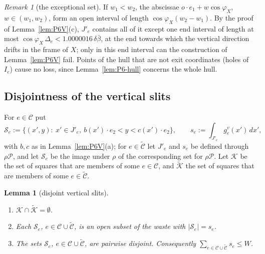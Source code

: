 \documentclass[11pt]{amsart}
\newcommand{\cP}{\mathcal P}
\newcommand{\bbar}{\bar\beta}
\newtheorem{lemma}[theorem]{Lemma}
\theoremstyle{definition}
\theoremstyle{remark}
\newtheorem{remark}[theorem]{Remark}
\numberwithin{equation}{section}
\begin{document}
\begin{remark}[the exceptional set]\label{rem:P6-exceptional}
If $w_1<w_2$, the abscissae $o\cdot e_1+w\cos\varphi_X$, $w\in(w_1,w_2)$, form an open interval of length
$\cos\varphi_X(w_2-w_1)$. By the proof of Lemma~\ref{lem:P6V}(c), $J'_e$ contains all of it except one end interval
of length at most $\cos\varphi_X\,\Delta_e<1.0000016\,\delta\bbar$, at the end towards which the vertical direction
drifts in the frame of $X$; only in this end interval can the construction of Lemma~\ref{lem:P6V} fail. Points of the
hull that are not exit coordinates (holes of $I_e$) cause no loss, since Lemma~\ref{lem:P6-hull} concerns the whole
hull.
\end{remark}

\subsection{Disjointness of the vertical slits}\label{ssec:P6-disjoint}

For $e\in\mathcal C$ put
\[
\mathcal S_e:=\{(x',y):\ x'\in J'_e,\ b(x')\cdot e_2<y<c(x')\cdot e_2\},\qquad s_e:=\int_{J'_e}g^v_e(x')\,dx' ,
\]
with $b,c$ as in Lemma~\ref{lem:P6V}(a); for $e\in\tilde{\mathcal C}$ let $J'_e$ and $s_e$ be defined through $\rho\cP$,
and let $\mathcal S_e$ be the image under $\rho$ of the corresponding set for $\rho\cP$. Let $\mathcal K$ be the set of
squares that are members of some $e\in\mathcal C$, and $\tilde{\mathcal K}$ the set of squares that are members of some
$e\in\tilde{\mathcal C}$.

\begin{lemma}[disjoint vertical slits]\label{lem:P6-disjoint}
\begin{enumerate}[label=(\alph*)]
\item $\mathcal K\cap\tilde{\mathcal K}=\emptyset$.
\item Each $\mathcal S_e$, $e\in\mathcal C\cup\tilde{\mathcal C}$, is an open subset of the waste with
$|\mathcal S_e|=s_e$.
\item The sets $\mathcal S_e$, $e\in\mathcal C\cup\tilde{\mathcal C}$, are pairwise disjoint. Consequently
$\sum_{e\in\mathcal C\cup\tilde{\mathcal C}}s_e\le W$.
\end{enumerate}
\end{lemma}
\end{document}
